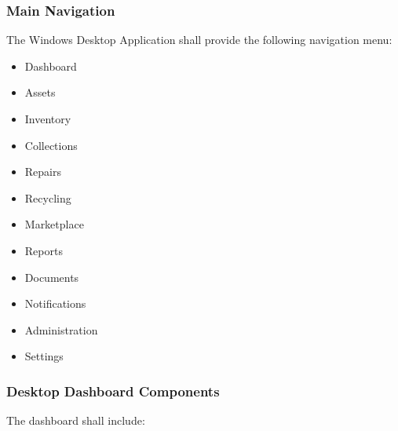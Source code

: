 
\subsubsection*{Main Navigation}

The Windows Desktop Application shall provide the following navigation
menu:

\begin{itemize}

\item Dashboard

\item Assets

\item Inventory

\item Collections

\item Repairs

\item Recycling

\item Marketplace

\item Reports

\item Documents

\item Notifications

\item Administration

\item Settings

\end{itemize}


\subsubsection*{Desktop Dashboard Components}

The dashboard shall include:

